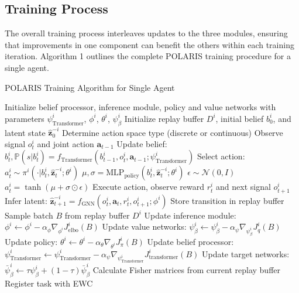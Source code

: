 \subsection{Training Process}

The overall training process interleaves updates to the three modules, ensuring that improvements in one component can benefit the others within each training iteration. Algorithm 1 outlines the complete POLARIS training procedure for a single agent.

\begin{algorithm}[H]
\caption{POLARIS Training Algorithm for Single Agent}
\begin{algorithmic}[1]
\State Initialize belief processor, inference module, policy and value networks with parameters $\psi^i_{\text{Transformer}}$, $\phi^i$, $\theta^i$, $\psi^i_{\beta}$
\State Initialize replay buffer $D^i$, initial belief $b^i_0$, and latent state $\boldsymbol{\hat{z}}^{-i}_0$
\State Determine action space type (discrete or continuous)
    \State Observe signal $o^i_t$ and joint action $\boldsymbol{a}_{t-1}$
    \State Update belief: $b^i_t, \mathbb{P}(s|b^i_t) = f_{\text{Transformer}}(b^i_{t-1}, o^i_t, \boldsymbol{a}_{t-1}; \psi^i_{\text{Transformer}})$
    \State Select action: 
        \State $a^i_t \sim \pi^i(\cdot|b^i_t, \boldsymbol{\hat{z}}^{-i}_t; \theta^i)$ 
    \Else
        \State $\mu, \sigma = \text{MLP}_{\text{policy}}(b^i_t, \boldsymbol{\hat{z}}^{-i}_t; \theta^i)$
        \State $\epsilon \sim \mathcal{N}(0, I)$
        \State $a^i_t = \tanh(\mu + \sigma \odot \epsilon)$ 
    \EndIf
    \State Execute action, observe reward $r^i_t$ and next signal $o^i_{t+1}$
    \State Infer latent: $\boldsymbol{\hat{z}}^{-i}_{t+1} = f_{\text{GNN}}(o^i_t, \boldsymbol{a}_t, r^i_t, o^i_{t+1}; \phi^i)$
    \State Store transition in replay buffer
        \State Sample batch $B$ from replay buffer $D^i$
        \State Update inference module: $\phi^i \leftarrow \phi^i - \alpha_{\phi} \nabla_{\phi^i} J^i_{\text{elbo}}(B)$
        \State Update value networks: $\psi^i_{\beta} \leftarrow \psi^i_{\beta} - \alpha_{\psi} \nabla_{\psi^i_{\beta}} J^i_{q}(B)$
        \State Update policy: $\theta^i \leftarrow \theta^i - \alpha_{\theta} \nabla_{\theta^i} J^i_{\pi}(B)$ 
        \State Update belief processor: $\psi^i_{\text{Transformer}} \leftarrow \psi^i_{\text{Transformer}} - \alpha_{\psi} \nabla_{\psi^i_{\text{Transformer}}} J^i_{\text{transformer}}(B)$
        \State Update target networks: $\bar{\psi}^i_{\beta} \leftarrow \tau \psi^i_{\beta} + (1-\tau) \bar{\psi}^i_{\beta}$
            \State Calculate Fisher matrices from current replay buffer
            \State Register task with EWC
        \EndIf
    \EndIf
\EndFor
\end{algorithmic}
\end{algorithm}


